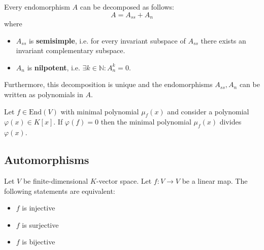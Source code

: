 	\begin{property}\label{linalgebra:jordan_chevalley}
		Every endomorphism $A$ can be decomposed as follows:
		\begin{equation}
			A = A_{ss} + A_n
		\end{equation}
		where
		\begin{itemize}
			\item $A_{ss}$ is \textbf{semisimple}, i.e. for every invariant subspace of $A_{ss}$ there exists an invariant complementary subspace.
			\item $A_n$ is \textbf{nilpotent}, i.e. $\exists k\in\mathbb{N}: A_n^k = 0$.
		\end{itemize}
		Furthermore, this decomposition is unique and the endomorphisms $A_{ss}, A_n$ can be written as polynomials in $A$.
	\end{property}
    
	\begin{property}\label{linalgebra:minimal_polynomial_divisor}
		Let $f\in\text{End}(V)$ with minimal polynomial $\mu_f(x)$ and consider a polynomial $\varphi(x)\in K[x]$. If $\varphi(f) = 0$ then the minimal polynomial $\mu_f(x)$ divides $\varphi(x)$. 
	\end{property}
	
\subsection{Automorphisms}

	\begin{property}
		Let $V$ be finite-dimensional $K$-vector space. Let $f:V\rightarrow V$ be a linear map. The following statements are equivalent:
        	\begin{itemize}
            		\item $f$ is injective
			\item $f$ is surjective
                	\item $f$ is bijective
		\end{itemize}
	\end{property}

